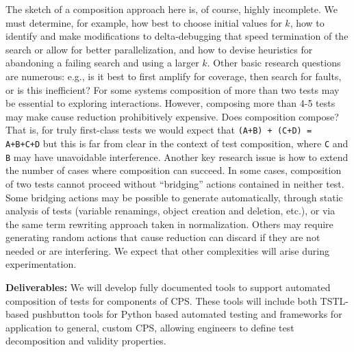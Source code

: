 \documentclass[12pt]{article}
\newcommand{\mycomment}[1]{}
\begin{document}
\mycomment{
Because this approach suggests that test composition is essentially a
search problem, an obvious question is why we use cause
reduction/delta-debugging rather than a more traditional search-based
evolutionary or genetic algorithm approach \cite{searchtest,McMinn04search-basedsoftware,FA11}.  First, we believe that
removal of operations is the only mutation of interest in this
context: crossover or random change in test actions is likely to
introduce invalid test behavior.  Our assumption is that tests to be
composed are valid in isolation, and only nearby behaviors are of
interest (or likely to maintain single-component validity).  Second,
many search-based techniques expect access to branch distances and
other intrusive instrumentation.  This may not be feasible for
embedded systems; we can use cause reduction with instrumentation only
for user-centric code or, in the worst case, for neither system.  This
necessitates guidance by other means.}

The sketch of a composition approach here is, of course, highly
incomplete. We must determine, for example, how best to choose initial
values for $k$, how to identify and make modifications to
delta-debugging that speed termination of the search or allow for
better parallelization, and how to devise heuristics for abandoning a
failing search and using a larger $k$.  Other basic research questions
are numerous: e.g., is it best to first amplify for coverage, then
search for faults, or is this inefficient? For some systems composition
of more than two tests may be essential to exploring interactions.
However, composing more than 4-5 tests may make cause reduction
prohibitively expensive.  Does composition compose?  That is, for
truly first-class tests we would expect that {\tt (A+B) + (C+D) =
  A+B+C+D} but this is far from clear in the context of test
composition, where {\tt C} and {\tt B} may have unavoidable
interference.  Another key research issue is how to extend the number
of cases where composition can succeed.  In some cases, composition of
two tests cannot proceed without ``bridging'' actions contained in
neither test.  Some bridging actions may be possible to generate
automatically, through static analysis of tests (variable renamings,
object creation and deletion, etc.), or via the same term rewriting
approach taken in normalization.  Others may require generating
random actions that cause reduction can discard if they are not needed
or are interfering.  We expect that other complexities will arise
during experimentation.

{\bf Deliverables:}  We will develop fully documented tools to support automated
composition of tests for components of CPS.  These tools will include
both TSTL-based pushbutton tools for Python based automated
testing and frameworks for application to general, custom CPS, allowing
engineers to define test decomposition and validity properties.



\end{document}
